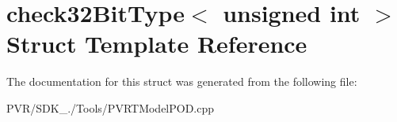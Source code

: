 \hypertarget{structcheck32_bit_type_3_01unsigned_01int_01_4}{\section{check32\+Bit\+Type$<$ unsigned int $>$ Struct Template Reference}
\label{structcheck32_bit_type_3_01unsigned_01int_01_4}
}


The documentation for this struct was generated from the following file\+:\begin{DoxyCompactItemize}
\item 
P\+V\+R/\+S\+D\+K\+\_./\+Tools/P\+V\+R\+T\+Model\+P\+O\+D.\+cpp\end{DoxyCompactItemize}
